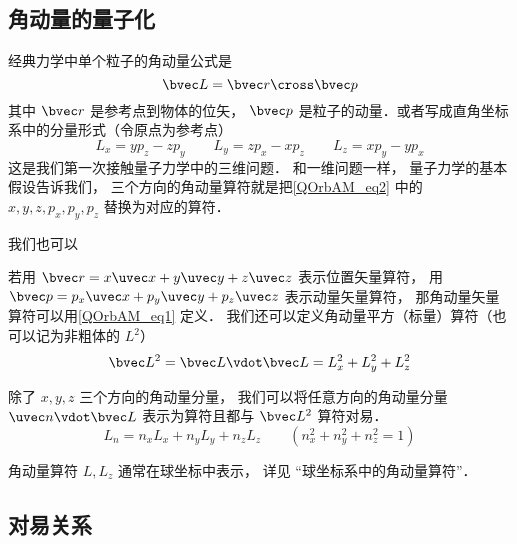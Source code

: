 
\begin{issues}
\issueDraft
\issueMissDepend
\end{issues}


\subsection{角动量的量子化}

经典力学中单个粒子的角动量公式是
\begin{equation}\label{QOrbAM_eq1}
\bvec L = \bvec r \cross \bvec p
\end{equation}
其中 $\bvec r$ 是参考点到物体的位矢， $\bvec p$ 是粒子的动量．或者写成直角坐标系中的分量形式（令原点为参考点）
\begin{equation}\label{QOrbAM_eq2}
L_x = y p_z - z p_y \qquad
L_y = z p_x - x p_z \qquad
L_z = x p_y - y p_x
\end{equation}   
这是我们第一次接触量子力学中的三维问题． 和一维问题一样， 量子力学的基本假设告诉我们， 三个方向的角动量算符就是把\autoref{QOrbAM_eq2} 中的 $x, y, z, p_x, p_y, p_z$ 替换为对应的算符．

 我们也可以

若用 $\bvec r = x\uvec x + y\uvec y + z\uvec z$ 表示位置矢量算符， 用 $\bvec p = p_x \uvec x + p_y\uvec y + p_z\uvec z$ 表示动量矢量算符， 那角动量矢量算符可以用\autoref{QOrbAM_eq1} 定义． 我们还可以定义角动量平方（标量）算符（也可以记为非粗体的 $L^2$）
\begin{equation}
\bvec L^2 = \bvec L \vdot \bvec L = L_x^2 + L_y^2 + L_z^2
\end{equation}

除了 $x, y, z$ 三个方向的角动量分量， 我们可以将任意方向的角动量分量 $\uvec n \vdot \bvec L$ 表示为算符且都与 $\bvec L^2$ 算符对易．
\begin{equation}
L_n = n_x L_x + n_y L_y + n_z L_z \qquad (n_x^2 + n_y^2 + n_z^2 = 1)
\end{equation}

角动量算符 $L, L_z$ 通常在球坐标中表示， 详见 “球坐标系中的角动量算符”．

\subsection{对易关系}

